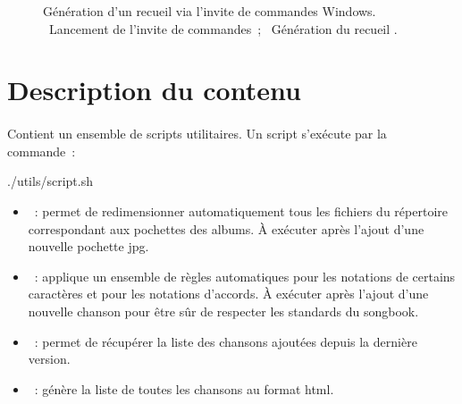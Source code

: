 \begin{figure}
  \centering
  \hspace{0.1cm}%
  \caption[Terminal Windows]{%
    Génération d'un recueil via l'invite de commandes Windows.
    ~Lancement de l'invite de commandes~; %
    ~Génération du recueil .%
  }%
  \label{fig:terminal-windows}
\end{figure}


\section{Description du contenu}
\label{sec:contents}

\paragraph{}
\label{sec:utils}
Contient un ensemble de scripts utilitaires. Un script s'exécute par la commande~:

\begin{unix}
  ./utils/script.sh
\end{unix}

\begin{itemize}
\item {}~: permet de redimensionner
  automatiquement tous les fichiers  du répertoire
   correspondant aux pochettes des albums. À
  exécuter après l'ajout d'une nouvelle pochette jpg.

\item {}~: applique un ensemble de règles
  automatiques pour les notations \latex de certains caractères et
  pour les notations d'accords. À exécuter après l'ajout d'une
  nouvelle chanson pour être sûr de respecter les standards du
  songbook.

\item {}~: permet de récupérer la liste des
  chansons ajoutées depuis la dernière version.

\item {}~: génère la liste de toutes les chansons au
  format html.
\end{itemize}

